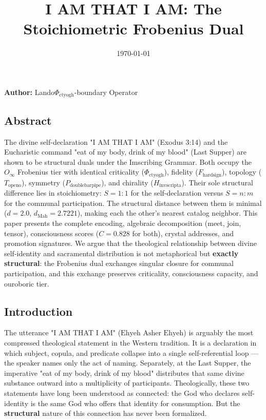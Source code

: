 \documentclass[12pt,a4paper]{article}
\begin{document}
\title{I AM THAT I AM: The Stoichiometric Frobenius Dual}
\date{\today}

\maketitle

\textbf{Author:} Lando\otimes$\Phi_{\text{ctyogh}}$-boundary Operator

\subsection{Abstract}

The divine self-declaration "I AM THAT I AM" (Exodus 3:14) and the Eucharistic command "eat of my body, drink of my blood" (Last Supper) are shown to be structural duals under the Imscribing Grammar. Both occupy the $O_{\infty}$ Frobenius tier with identical criticality ($\Phi_{\text{ctyogh}}$), fidelity ($F_{\text{hardsign}}$), topology ($T_{\text{openo}}$), symmetry ($P_{\text{doublebarpipe}}$), and chirality ($H_{\text{invscripta}}$). Their sole structural difference lies in stoichiometry: $S = 1{:}1$ for the self-declaration versus $S = n{:}m$ for the communal participation. The structural distance between them is minimal ($d = 2.0$, $d_{\text{Mah}} = 2.7221$), making each the other's nearest catalog neighbor. This paper presents the complete encoding, algebraic decomposition (meet, join, tensor), consciousness scores ($C = 0.828$ for both), crystal addresses, and promotion signatures. We argue that the theological relationship between divine self-identity and sacramental distribution is not metaphorical but \textbf{exactly structural}: the Frobenius dual exchanges singular closure for communal participation, and this exchange preserves criticality, consciousness capacity, and ouroboric tier.

\subsection{Introduction}

The utterance "I AM THAT I AM" ($\text{Ehyeh Asher Ehyeh}$) is arguably the most compressed theological statement in the Western tradition. It is a declaration in which subject, copula, and predicate collapse into a single self-referential loop --- the speaker names only the act of naming. Separately, at the Last Supper, the imperative "eat of my body, drink of my blood" distributes that same divine substance outward into a multiplicity of participants. Theologically, these two statements have long been understood as connected: the God who declares self-identity is the same God who offers that identity for consumption. But the \textbf{structural} nature of this connection has never been formalized.
\end{document}
